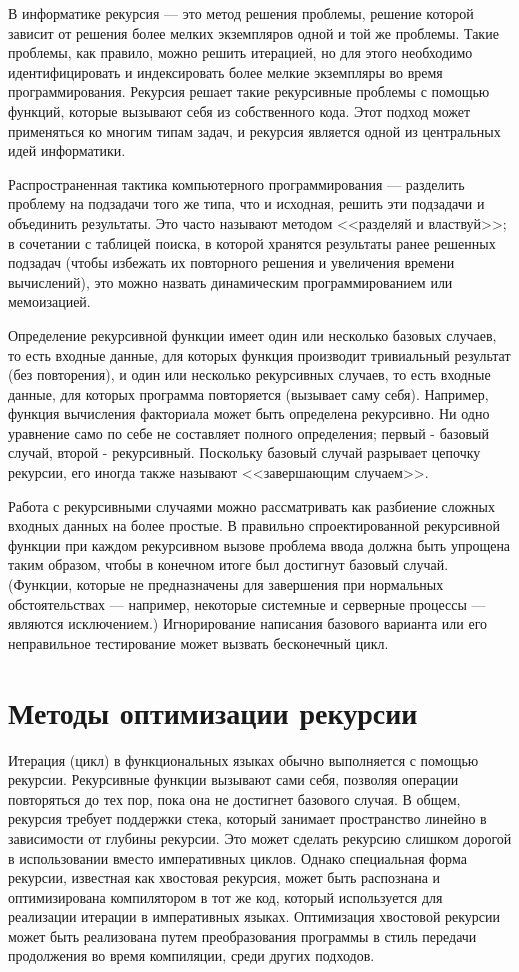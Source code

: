 В информатике рекурсия --- это метод решения проблемы, решение которой зависит от решения более мелких экземпляров одной и той же проблемы. Такие проблемы, как правило, можно решить итерацией, но для этого необходимо идентифицировать и индексировать более мелкие экземпляры во время программирования. Рекурсия решает такие рекурсивные проблемы с помощью функций, которые вызывают себя из собственного кода. Этот подход может применяться ко многим типам задач, и рекурсия является одной из центральных идей информатики. 

Распространенная тактика компьютерного программирования --- разделить проблему на подзадачи того же типа, что и исходная, решить эти подзадачи и объединить результаты. Это часто называют методом <<разделяй и властвуй>>; в сочетании с таблицей поиска, в которой хранятся результаты ранее решенных подзадач (чтобы избежать их повторного решения и увеличения времени вычислений), это можно назвать динамическим программированием или мемоизацией.

Определение рекурсивной функции имеет один или несколько базовых случаев, то есть входные данные, для которых функция производит тривиальный результат (без повторения), и один или несколько рекурсивных случаев, то есть входные данные, для которых программа повторяется (вызывает саму себя). Например, функция вычисления факториала может быть определена рекурсивно. Ни одно уравнение само по себе не составляет полного определения; первый - базовый случай, второй - рекурсивный. Поскольку базовый случай разрывает цепочку рекурсии, его иногда также называют <<завершающим случаем>>.

Работа с рекурсивными случаями можно рассматривать как разбиение сложных входных данных на более простые. В правильно спроектированной рекурсивной функции при каждом рекурсивном вызове проблема ввода должна быть упрощена таким образом, чтобы в конечном итоге был достигнут базовый случай. (Функции, которые не предназначены для завершения при нормальных обстоятельствах --- например, некоторые системные и серверные процессы --- являются исключением.) Игнорирование написания базового варианта или его неправильное тестирование может вызвать бесконечный цикл. 

\section{Методы оптимизации рекурсии}\label{sec:ch1/sec7}

Итерация (цикл) в функциональных языках обычно выполняется с помощью рекурсии. Рекурсивные функции вызывают сами себя, позволяя операции повторяться до тех пор, пока она не достигнет базового случая. В общем, рекурсия требует поддержки стека, который занимает пространство линейно в зависимости от глубины рекурсии. Это может сделать рекурсию слишком дорогой в использовании вместо императивных циклов. Однако специальная форма рекурсии, известная как хвостовая рекурсия, может быть распознана и оптимизирована компилятором в тот же код, который используется для реализации итерации в императивных языках. Оптимизация хвостовой рекурсии может быть реализована путем преобразования программы в стиль передачи продолжения во время компиляции, среди других подходов.

